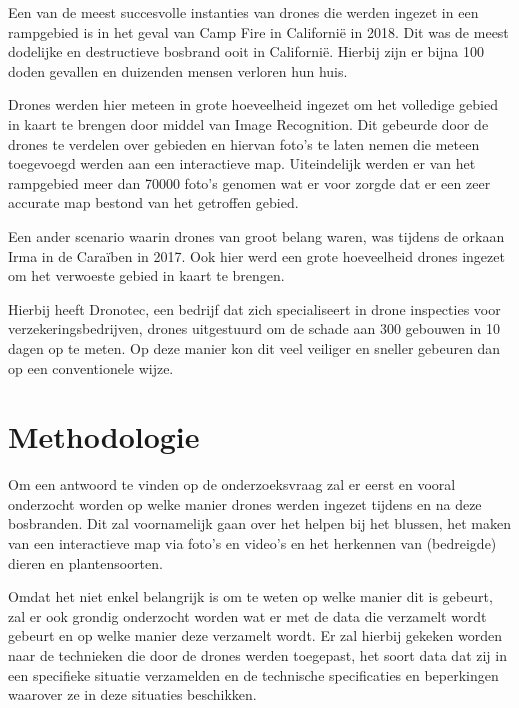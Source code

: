 Een van de meest succesvolle instanties van drones die werden ingezet in een rampgebied is in het geval van Camp Fire in Californië in 2018. Dit was de meest dodelijke en destructieve bosbrand ooit in Californië. Hierbij zijn er bijna 100 doden gevallen en duizenden mensen verloren hun huis.

Drones werden hier meteen in grote hoeveelheid ingezet om het volledige gebied in kaart te brengen door middel van Image Recognition. Dit gebeurde door de drones te verdelen over gebieden en hiervan foto's te laten nemen die meteen toegevoegd werden aan een interactieve map. Uiteindelijk werden er van het rampgebied meer dan 70000 foto's genomen wat er voor zorgde dat er een zeer accurate map bestond van het getroffen gebied. \autocite{Reagan2019}

Een ander scenario waarin drones van groot belang waren, was tijdens de orkaan Irma in de Caraïben in 2017. Ook hier werd een grote hoeveelheid drones ingezet om het verwoeste gebied in kaart te brengen. \autocite{Morant}

Hierbij heeft Dronotec, een bedrijf dat zich specialiseert in drone inspecties voor verzekeringsbedrijven, drones uitgestuurd om de schade aan 300 gebouwen in 10 dagen op te meten. Op deze manier kon dit veel veiliger en sneller gebeuren dan op een conventionele wijze.


\section{Methodologie}
\label{sec:methodologie}

Om een antwoord te vinden op de onderzoeksvraag zal er eerst en vooral onderzocht worden op welke manier drones werden ingezet tijdens en na deze bosbranden. Dit zal voornamelijk gaan over het helpen bij het blussen, het maken van een interactieve map via foto's en video's en het herkennen van (bedreigde) dieren en plantensoorten.

Omdat het niet enkel belangrijk is om te weten op welke manier dit is gebeurt, zal er ook grondig onderzocht worden wat er met de data die verzamelt wordt gebeurt en op welke manier deze verzamelt wordt. Er zal hierbij gekeken worden naar de technieken die door de drones werden toegepast, het soort data dat zij in een specifieke situatie verzamelden en de technische specificaties en beperkingen waarover ze in deze situaties beschikken. 

